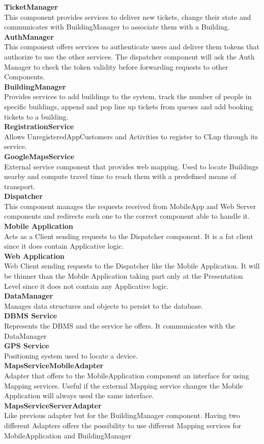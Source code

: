 \textbf{TicketManager}\\
This component provides services to deliver new tickets, change their state and communicates with BuildingManager to associate them with a Building.\\
\textbf{AuthManager}\\
This component offers services to authenticate users and deliver them tokens that authorize to use the other services. The dispatcher component will ask the Auth Manager to check the token validity before forwarding requests to other Components.\\
\textbf{BuildingManager}\\
Provides services to add buildings to the system, track the number of people in specific buildings, append and pop line up tickets from queues and add booking tickets to a building.\\
\textbf{RegistrationService}\\
Allows UnregisteredAppCustomers and Activities to register to CLup through its service.\\
\textbf{GoogleMapsService}\\
External service component that provides web mapping. Used to locate Buildings nearby and compute travel time to reach them with a predefined means of transport.\\
\textbf{Dispatcher}\\
This component manages the requests received from MobileApp and Web Server components and redirects each one to the correct component able to handle it.\\
\textbf{Mobile Application}\\
Acts as a Client sending requests to the Dispatcher component.
It is a fat client since it does contain Applicative logic.\\
\textbf{Web Application}\\
Web Client sending requests to the Dispatcher like the Mobile Application. It will be thinner than the Mobile Application taking part only at the Presentation Level since it does not contain any Applicative logic.\\
\textbf{DataManager}\\
Manages data structures and objects to persist to the database.\\
\textbf{DBMS Service}\\
Represents the DBMS and the service he offers. It communicates with the DataManager\\
\textbf{GPS Service}\\
Positioning system used to locate a device.\\
\textbf{MapsServiceMobileAdapter}\\
Adapter that offers to the MobileApplication component an interface for using Mapping services. Useful if the external Mapping service changes the Mobile Application will always used the same interface.\\
\textbf{MapsServiceServerAdapter}\\
Like previous adapter but for the BuildingManager component. Having two different Adapters offers the possibility to use different Mapping services for MobileApplication and BuildingManager 


